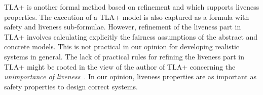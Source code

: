 %
%
%
TLA+\cite{DBLP_books_aw_Lamport2002} is another formal method based on
refinement and which supports liveness properties.  The
execution of a TLA+ model is also captured as a formula with safety
and liveness sub-formulae.  However, refinement of the liveness part
in TLA+ involves calculating explicitly the fairness assumptions of the
abstract and concrete models.  This is not practical in our
opinion for developing realistic systems in general.  The
lack of practical rules for refining the liveness part in TLA+ might be
rooted in the view of the author of TLA+ concerning the
\emph{unimportance of liveness}~\cite[Chapter
8]{DBLP_books_aw_Lamport2002}.  In our opinion, liveness
properties are as important as safety properties to design
correct systems.

